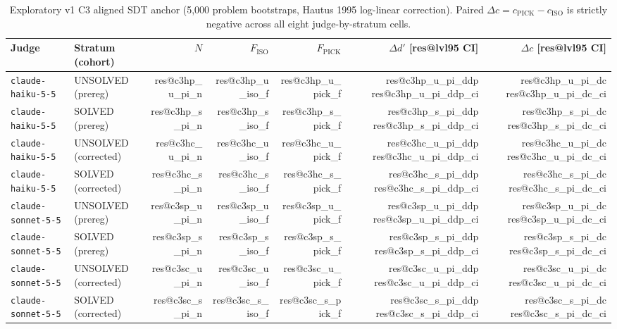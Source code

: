 \documentclass[10pt,twocolumn]{article}
\makeatletter
\newcommand{\res}[1]{\csname res@#1\endcsname}
\makeatother
\begin{document}
\begin{table}[t]
\centering\footnotesize
\setlength{\tabcolsep}{4.5pt}
\begin{tabular}{llrrrrr}
\toprule
Judge & Stratum (cohort) & $N$ & $F_{\mathrm{ISO}}$ & $F_{\mathrm{PICK}}$ & $\Delta d'$ [\res{lvl95} CI] & $\Delta c$ [\res{lvl95} CI] \\
\midrule
\texttt{claude-haiku-5-5} & UNSOLVED (prereg) & \res{c3hp_u_pi_n} & \res{c3hp_u_iso_f} & \res{c3hp_u_pick_f} & \res{c3hp_u_pi_ddp} \res{c3hp_u_pi_ddp_ci} & \res{c3hp_u_pi_dc} \res{c3hp_u_pi_dc_ci} \\
\texttt{claude-haiku-5-5} & SOLVED (prereg) & \res{c3hp_s_pi_n} & \res{c3hp_s_iso_f} & \res{c3hp_s_pick_f} & \res{c3hp_s_pi_ddp} \res{c3hp_s_pi_ddp_ci} & \res{c3hp_s_pi_dc} \res{c3hp_s_pi_dc_ci} \\
\texttt{claude-haiku-5-5} & UNSOLVED (corrected) & \res{c3hc_u_pi_n} & \res{c3hc_u_iso_f} & \res{c3hc_u_pick_f} & \res{c3hc_u_pi_ddp} \res{c3hc_u_pi_ddp_ci} & \res{c3hc_u_pi_dc} \res{c3hc_u_pi_dc_ci} \\
\texttt{claude-haiku-5-5} & SOLVED (corrected) & \res{c3hc_s_pi_n} & \res{c3hc_s_iso_f} & \res{c3hc_s_pick_f} & \res{c3hc_s_pi_ddp} \res{c3hc_s_pi_ddp_ci} & \res{c3hc_s_pi_dc} \res{c3hc_s_pi_dc_ci} \\
\midrule
\texttt{claude-sonnet-5-5} & UNSOLVED (prereg) & \res{c3sp_u_pi_n} & \res{c3sp_u_iso_f} & \res{c3sp_u_pick_f} & \res{c3sp_u_pi_ddp} \res{c3sp_u_pi_ddp_ci} & \res{c3sp_u_pi_dc} \res{c3sp_u_pi_dc_ci} \\
\texttt{claude-sonnet-5-5} & SOLVED (prereg) & \res{c3sp_s_pi_n} & \res{c3sp_s_iso_f} & \res{c3sp_s_pick_f} & \res{c3sp_s_pi_ddp} \res{c3sp_s_pi_ddp_ci} & \res{c3sp_s_pi_dc} \res{c3sp_s_pi_dc_ci} \\
\texttt{claude-sonnet-5-5} & UNSOLVED (corrected) & \res{c3sc_u_pi_n} & \res{c3sc_u_iso_f} & \res{c3sc_u_pick_f} & \res{c3sc_u_pi_ddp} \res{c3sc_u_pi_ddp_ci} & \res{c3sc_u_pi_dc} \res{c3sc_u_pi_dc_ci} \\
\texttt{claude-sonnet-5-5} & SOLVED (corrected) & \res{c3sc_s_pi_n} & \res{c3sc_s_iso_f} & \res{c3sc_s_pick_f} & \res{c3sc_s_pi_ddp} \res{c3sc_s_pi_ddp_ci} & \res{c3sc_s_pi_dc} \res{c3sc_s_pi_dc_ci} \\
\bottomrule
\end{tabular}
\caption{Exploratory v1 C3 aligned SDT anchor (5,000 problem bootstraps, Hautus 1995 log-linear correction). Paired $\Delta c = c_{\mathrm{PICK}} - c_{\mathrm{ISO}}$ is strictly negative across all eight judge-by-stratum cells.}
\label{tab:v1sdt}
\end{table}
\end{document}
